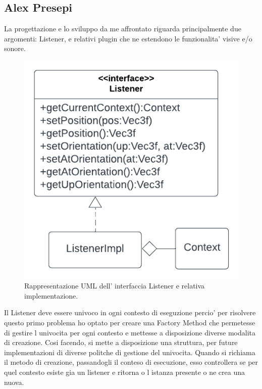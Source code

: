 \documentclass[a4paper,12pt]{report}
\begin{document}
\subsection*{Alex Presepi}
La progettazione e lo sviluppo da me affrontato riguarda principalmente due argomenti: Listener, e relativi plugin 
che ne estendono le funzionalita' visive e/o sonore.
\begin{figure}[H]
\centering{}
\includegraphics[width=\textwidth]{img/listener/Listener.png}
\caption{Rappresentazione UML dell' interfaccia Listener e relativa implementazione.}
\label{img:Listener}
\end{figure}
%
Il Listener deve essere univoco in ogni contesto di eseguzione percio' per risolvere questo primo problema ho optato per creare una Factory Method che permetesse di gestire l univocita per ogni contesto e mettesse a disposizione diverse modalita di creazione. Cosi facendo, si mette a disposizione una struttura, per future  implementazioni di diverse politche di gestione del univocita. Quando si richiama il metodo di creazione, 
passandogli il conteso di esecuzione, esso controllera se per quel contesto esiste gia un listener e ritorna o l istanza presente o ne crea una nuova. 
\end{document}
